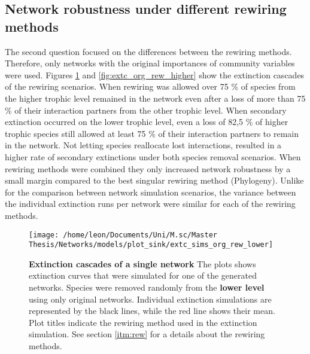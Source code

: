 \documentclass[12pt,a4paper]{article}
\begin{document}


\subsection{Network robustness under different rewiring methods}

The second question focused on the differences between the rewiring methods. Therefore, only networks with the original importances of community variables were used. 
Figures \ref{fig:extc_org_rew_lower} and \ref{fig:extc_org_rew_higher} show the extinction cascades of the rewiring scenarios. When rewiring was allowed over 75 \% of species from the higher trophic level remained in the network even after a loss of more than 75 \% of their interaction partners from the other trophic level. When secondary extinction occurred on the lower trophic level, even a loss of 82,5 \% of higher trophic species still allowed at least 75 \% of their interaction partners to remain in the network. Not letting species reallocate lost interactions, resulted in a higher rate of secondary extinctions under both species removal scenarios. When rewiring methods were combined they only increased network robustness by a small margin compared to the best singular rewiring method (Phylogeny). Unlike for the comparison between network simulation scenarios, the variance between the individual extinction runs per network were similar for each of the rewiring methods. 

\begin{figure}[H]
	 \centering
	 \texttt{[image: /home/leon/Documents/Uni/M.sc/Master Thesis/Networks/models/plot\_sink/extc\_sims\_org\_rew\_lower]}
	 \captionsetup{width = \textwidth}
	 \caption{\textbf{Extinction cascades of a single network} The plots shows extinction curves that were simulated for one of the generated networks. Species were removed randomly from the \textbf{lower level} using only original networks. Individual extinction simulations are represented by the black lines, while the red line shows their mean. Plot titles indicate the rewiring method used in the extinction simulation. See section \ref{itm:rew} for a details about the rewiring methods.}
	 \label{fig:extc_org_rew_lower}
\end{figure}
\end{document}
